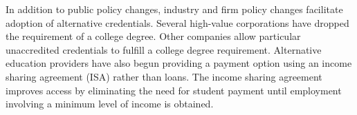 \documentclass[review]{elsarticle}
\begin{document}
In addition to public policy changes, industry and firm policy changes facilitate adoption of alternative credentials.
Several high-value corporations have dropped the requirement of a college degree. %
Other companies allow particular unaccredited credentials to fulfill a college degree requirement. %
Alternative education providers have also begun providing a payment option using an income sharing agreement (ISA) rather than loans.
The income sharing agreement improves access by eliminating the need for student payment until employment involving a minimum level of income is obtained.



\end{document}
